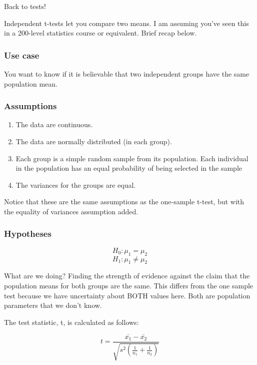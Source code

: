 \documentclass[
  openany]{book}
\providecommand{\tightlist}{%
  \setlength{\itemsep}{0pt}\setlength{\parskip}{0pt}}
\begin{document}
Back to tests!

Independent t-tests let you compare two means. I am assuming you've seen this in a 200-level statistics course or equivalent. Brief recap below.

\hypertarget{use-case-1}{%
\subsubsection{Use case}\label{use-case-1}}

You want to know if it is believable that two independent groups have the same population mean.

\hypertarget{assumptions-1}{%
\subsubsection{Assumptions}\label{assumptions-1}}

\begin{enumerate}
\def\labelenumi{\arabic{enumi}.}
\tightlist
\item
  The data are continuous.
\item
  The data are normally distributed (in each group).
\item
  Each group is a simple random sample from its population. Each individual in the population has an equal probability of being selected in the sample
\item
  The variances for the groups are equal.
\end{enumerate}

Notice that these are the same assumptions as the one-sample t-test, but with the equality of variances assumption added.

\hypertarget{hypotheses-1}{%
\subsubsection{Hypotheses}\label{hypotheses-1}}

\[H_0: \mu_1 = \mu_2\]
\[H_1: \mu_1 \ne \mu_2\]

What are we doing? Finding the strength of evidence against the claim that the population means for both groups are the same. This differs from the one sample test because we have uncertainty about BOTH values here. Both are population parameters that we don't know.

The test statistic, t, is calculated as follows:

\[ t = \frac{\bar{x_1} - \bar{x_2}}{\sqrt{s^2(\frac{1}{n_1} + \frac{1}{n_2})}} \]
\end{document}
